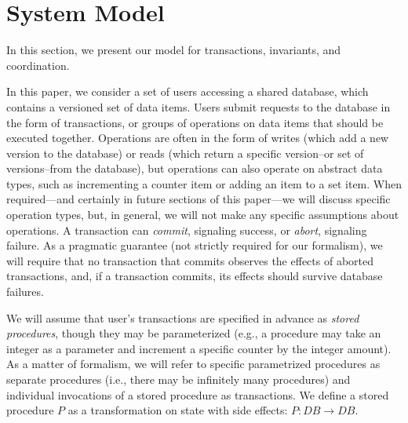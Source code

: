 
\section{System Model}
\label{sec:model}

In this section, we present our model for transactions, invariants,
and coordination.

 In this paper, we
consider a set of users accessing a shared database, which contains a
versioned set of data items. Users submit requests to the database in
the form of transactions, or groups of operations on data items that
should be executed together. Operations are often in the form of
writes (which add a new version to the database) or reads (which
return a specific version--or set of versions--from the database), but
operations can also operate on abstract data types, such as
incrementing a counter item or adding an item to a set item. When
required---and certainly in future sections of this paper---we will
discuss specific operation types, but, in general, we will not make
any specific assumptions about operations. A transaction can
\textit{commit}, signaling success, or \textit{abort}, signaling
failure. As a pragmatic guarantee (not strictly required for our
formalism), we will require that no transaction that commits observes
the effects of aborted transactions, and, if a transaction commits,
its effects should survive database failures.

We will assume that user's transactions are specified in advance as
\textit{stored procedures}, though they may be parameterized (e.g., a
procedure may take an integer as a parameter and increment a specific
counter by the integer amount). As a matter of formalism, we will
refer to specific parametrized procedures as separate procedures
(i.e., there may be infinitely many procedures) and individual
invocations of a stored procedure as transactions.  We define a stored
procedure $P$ as a transformation on state with side effects: $P: DB
\rightarrow DB$.

